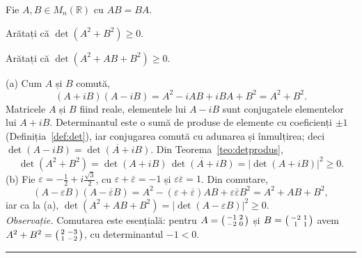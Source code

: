 Fie $A,B\in M_n(\mathbb{R})$ cu $AB=BA$.
\begin{parti}
  \item Arătați că $\det(A^2+B^2)\ge0$.
  \item Arătați că $\det(A^2+AB+B^2)\ge0$.
\end{parti}
\sol (a) Cum $A$ și $B$ comută,
\[ (A+iB)(A-iB)=A^2-iAB+iBA+B^2=A^2+B^2 . \]
Matricele $A$ și $B$ fiind reale, elementele lui $A-iB$ sunt conjugatele elementelor lui $A+iB$. Determinantul este o sumă de produse de elemente cu coeficienți $\pm1$ (Definiția~\ref{def:det}), iar conjugarea comută cu adunarea și înmulțirea; deci $\det(A-iB)=\overline{\det(A+iB)}$. Din Teorema~\ref{teo:detprodus},
\[ \det(A^2+B^2)=\det(A+iB)\,\overline{\det(A+iB)}=\bigl|\det(A+iB)\bigr|^2\ge0 . \]
(b) Fie $\varepsilon=-\frac12+i\frac{\sqrt3}2$, cu $\varepsilon+\overline\varepsilon=-1$ și $\varepsilon\overline\varepsilon=1$. Din comutare,
\[ (A-\varepsilon B)(A-\overline\varepsilon B)=A^2-(\varepsilon+\overline\varepsilon)AB+\varepsilon\overline\varepsilon B^2=A^2+AB+B^2, \]
iar ca la (a), $\det(A^2+AB+B^2)=|\det(A-\varepsilon B)|^2\ge0$.\\[2pt]
\emph{Observație.} Comutarea este esențială: pentru $A=\begin{psmallmatrix}-1&2\\-2&0\end{psmallmatrix}$ și $B=\begin{psmallmatrix}-2&1\\1&1\end{psmallmatrix}$ avem $A^2+B^2=\begin{psmallmatrix}2&-3\\1&-2\end{psmallmatrix}$, cu determinantul $-1<0$.
\vspace{1mm}\hrule

